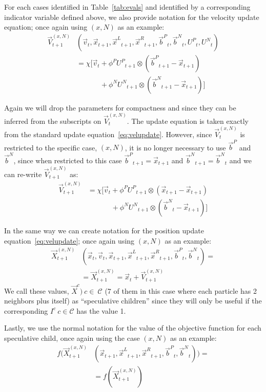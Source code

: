 \documentclass[journal,letterpaper]{IEEEtran}
\providecommand{\pers}{\ensuremath{P}}
\providecommand{\neigh}{\ensuremath{N}}
\providecommand{\leftind}{\ensuremath{L}}
\providecommand{\rightind}{\ensuremath{R}}
\providecommand{\nURand}{\ensuremath{U^\neigh}}
\providecommand{\pURand}{\ensuremath{U^\pers}}
\providecommand{\ppos}{\ensuremath{\Vec{x}}}
\providecommand{\pvel}{\ensuremath{\Vec{v}}}
\providecommand{\nbest}{\ensuremath{\Vec{b}^\neigh}}
\providecommand{\pbest}{\ensuremath{\Vec{b}^\pers}}
\providecommand{\constriction}{\ensuremath{\chi}}
\providecommand{\ncoeff}{\ensuremath{\phi^\neigh}}
\providecommand{\pcoeff}{\ensuremath{\phi^\pers}}
\providecommand{\ofunc}{\ensuremath{f}}
\providecommand{\indic}{\ensuremath{I}}
\providecommand{\specvel}{\ensuremath{\vec{V}}}
\providecommand{\specpos}{\ensuremath{\vec{X}}}
\providecommand{\leftn}{\ensuremath{\Vec{x}^\leftind}}
\providecommand{\rightn}{\ensuremath{\Vec{x}^\rightind}}
\providecommand{\caseset}{\ensuremath{\mathcal{C}}}
\providecommand{\casexn}{\ensuremath{(x,\neigh)}}
\begin{document}
For each cases identified in Table~\ref{tab:evals} and identified by a
corresponding indicator variable defined above, we also provide notation for the velocity
update equation; once again using $\casexn$ as an example:
\begin{align}
\nonumber
	\specvel_{t+1}^{\casexn} & (\pvel_t, \ppos_{t+1}, \leftn_{t+1}, \rightn_{t+1}, \pbest_{t},
        \nbest_{t}, \pURand_{t}, \nURand_{t}) \\
\label{eq:defvocasexn}
		&= \constriction \bigl[ \pvel_{t} +
			\pcoeff\pURand_{t+1}\otimes(\pbest_{t+1} - \ppos_{t+1}) \\
		& \quad \quad \quad \; + \ncoeff\nURand_{t+1}\otimes(\nbest_{t+1} - \ppos_{t+1})
		\bigr]
\end{align}

Again we will drop the parameters for compactness and since
they can be inferred from the subscripts on $\specvel_{t}^{\casexn}$.
The update equation is taken exactly from the standard update equation~\eqref{eq:velupdate}.
However, since $\specvel_{t}^{\casexn}$ is restricted to the specific case, $\casexn$,
it is no longer necessary to use $\pbest$ and $\nbest$, since when restricted to this case
$\pbest_{t+1}=\ppos_{t+1}$ and $\nbest_{t+1}=\nbest_{t}$ and we can re-write
$\specvel_{t+1}^{\casexn}$ as:
\begin{align}
\nonumber
	\specvel_{t+1}^{\casexn} &= \constriction \bigl[ \pvel_{t} +
			\pcoeff\pURand_{t+1}\otimes(\ppos_{t+1} - \ppos_{t+1}) \\
\label{eq:defvcasexn}
			& \quad \quad \quad \; + \ncoeff\nURand_{t+1}\otimes(\nbest_{t} - \ppos_{t+1})
		\bigr]
\end{align}

In the same way we can create notation for the position update
equation~\eqref{eq:velupdate}; once again using $\casexn$ as an example:
\begin{align}
\label{eq:defpcasexn}
	\specpos_{t+1}^{\casexn} & (\ppos_{t}, \pvel_{t},\ppos_{t+1} ,\leftn_{t+1},\rightn_{t+1} ,\pbest_{t} ,\nbest_{t})= \\
\nonumber
	& = \specpos_{t+1}^{\casexn} =  \ppos_{t} + \specvel_{t+1}^{\casexn}
\end{align}
We call these values, $\specpos^{c}) \ c \in\ \caseset$ (7 of them in this case where each particle has 2 neighbors plus itself)
as ``speculative children''
since they will only be useful if the corresponding $\indic^{c} \ c \in \caseset$ has the value 1.

Lastly, we use the normal notation for the value of the objective function for each speculative child,
once again using the case $\casexn$ as an example:
\begin{align}
\nonumber
	\ofunc(\specpos_{t+1}^{\casexn} & (\ppos_{t+1} ,\leftn_{t+1},\rightn_{t+1} ,\pbest_{t} ,\nbest_{t}))= \\
\label{eq:deffcasexn}
	& =  \ofunc(\specpos_{t+1}^{\casexn})
\end{align}
\end{document}

